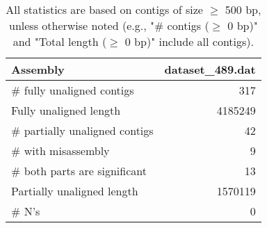 \documentclass[12pt,a4paper]{article}
\begin{document}
\begin{table}[ht]
\begin{center}
\caption{All statistics are based on contigs of size $\geq$ 500 bp, unless otherwise noted (e.g., "\# contigs ($\geq$ 0 bp)" and "Total length ($\geq$ 0 bp)" include all contigs).}
\begin{tabular}{|l*{1}{|r}|}
\hline
Assembly & dataset\_489.dat \\ \hline
\# fully unaligned contigs & 317 \\ \hline
Fully unaligned length & 4185249 \\ \hline
\# partially unaligned contigs & 42 \\ \hline
\hspace{5mm}\# with misassembly & 9 \\ \hline
\hspace{5mm}\# both parts are significant & 13 \\ \hline
Partially unaligned length & 1570119 \\ \hline
\# N's & 0 \\ \hline
\end{tabular}
\end{center}
\end{table}
\end{document}
